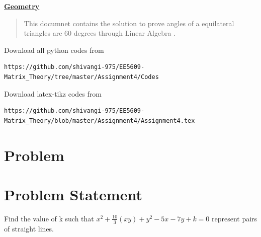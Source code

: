 \documentclass[journal,12pt,twocolumn]{IEEEtran}
\begin{document}
%
\vspace{2ex}
\begin{center}
{\underline{\Large \bf Geometry}}
\end{center}
\begin{abstract}
This documnet contains the solution to prove angles of a equilateral triangles are 60 degrees through Linear Algebra .
\end{abstract}
Download all python codes from
%
\begin{lstlisting}
https://github.com/shivangi-975/EE5609-Matrix_Theory/tree/master/Assignment4/Codes
\end{lstlisting}
%
Download latex-tikz codes from
%
\begin{lstlisting}
https://github.com/shivangi-975/EE5609-Matrix_Theory/blob/master/Assignment4/Assignment4.tex
\end{lstlisting}
%

\section{Problem}
%

\section{Problem Statement}
Find the value of k such that $x^2+\frac{10}{3}(xy)+y^2 -5x -7y + k =0$ represent pairs of straight lines.
\end{document}
